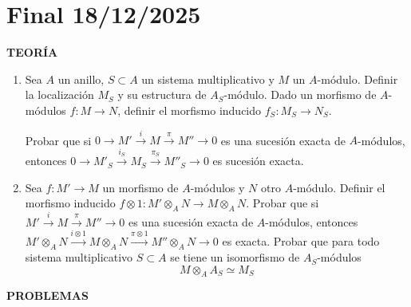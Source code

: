 \chapter{Final 18/12/2025} \noindent \textbf{TEOR\'IA}
\begin{enumerate}[1)] 
    \item Sea $A$ un anillo, $S \subset A$ un sistema multiplicativo y $M$ un $A$-módulo. Definir la localización $M_S$ y su estructura de $A_S$-módulo. Dado un morfismo de $A$-módulos $f: M \to N$, definir el morfismo inducido $f_S: M_S \to N_S$.
    
    Probar que si $0 \to M' \xrightarrow{i} M \xrightarrow{\pi} M'' \to 0$ es una sucesión exacta de $A$-módulos, entonces $0 \to M'_S \xrightarrow{i_S} M_S \xrightarrow{\pi_S} M''_S \to 0$ es sucesión exacta.
    \item Sea $f: M' \to M$ un morfismo de $A$-módulos y $N$ otro $A$-módulo. Definir el morfismo inducido $f \otimes 1: M' \otimes_A N \to M \otimes_A N$. Probar que si $M' \xrightarrow{i} M \xrightarrow{\pi} M'' \to 0$ es una sucesión exacta de $A$-módulos, entonces $M' \otimes_A N \xrightarrow{i \otimes 1} M \otimes_A N \xrightarrow{\pi \otimes 1} M'' \otimes_A N \to 0$ es exacta. Probar que para todo sistema multiplicativo $S \subset A$ se tiene un isomorfismo de $A_S$-módulos$$M \otimes_A A_S \simeq M_S$$
\end{enumerate}
    \textbf{PROBLEMAS}
